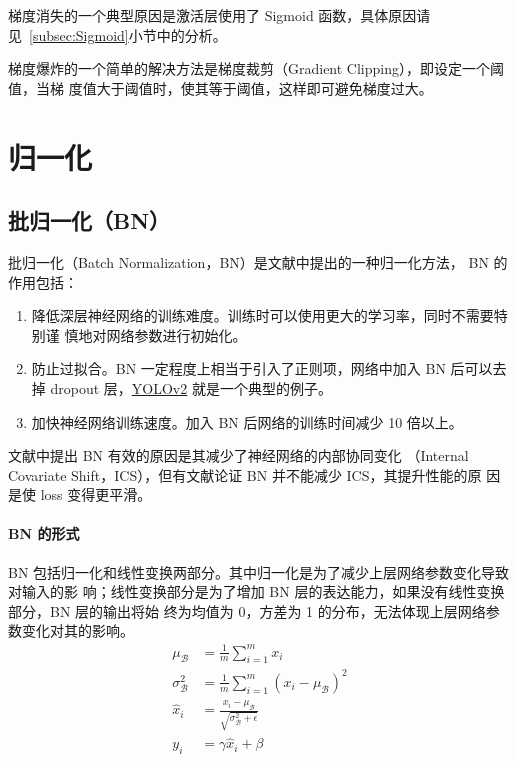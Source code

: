 梯度消失的一个典型原因是激活层使用了 Sigmoid 函数，具体原因请
见~\ref{subsec:Sigmoid}小节中的分析。

梯度爆炸的一个简单的解决方法是梯度裁剪（Gradient Clipping），即设定一个阈值，当梯
度值大于阈值时，使其等于阈值，这样即可避免梯度过大。

\section{归一化}

\subsection{批归一化（BN）}
\label{sub:BN}

批归一化（Batch Normalization，BN）是文献中提出的一种归一化方法，
BN 的作用包括：

\begin{enumerate}
  \item 降低深层神经网络的训练难度。训练时可以使用更大的学习率，同时不需要特别谨
    慎地对网络参数进行初始化。
  \item 防止过拟合。BN 一定程度上相当于引入了正则项，网络中加入 BN 后可以去
    掉 dropout 层，\hyperref[subsec:YOLOv2]{YOLOv2} 就是一个典型的例子。
  \item 加快神经网络训练速度。加入 BN 后网络的训练时间减少 10 倍以上。
\end{enumerate}

文献中提出 BN 有效的原因是其减少了神经网络的内部协同变化
（Internal Covariate Shift，ICS），但有文献论证 BN 并不能减少 ICS，其提升性能的原
因是使 loss 变得更平滑。

\paragraph{BN 的形式}
BN 包括归一化和线性变换两部分。其中归一化是为了减少上层网络参数变化导致对输入的影
响；线性变换部分是为了增加 BN 层的表达能力，如果没有线性变换部分，BN 层的输出将始
终为均值为 0，方差为 1 的分布，无法体现上层网络参数变化对其的影响。
\begin{align}
  \label{equ:BN}
  \mu_{\mathcal{B}} & = \frac{1}{m} \sum_{i=1}^{m} x_i \\
  \sigma_{\mathcal{B}}^2 & = \frac{1}{m} \sum_{i=1}^{m} (x_i-\mu_{\mathcal{B}})^2 \\
  \hat{x}_i & = \frac{x_i - \mu_{\mathcal{B}}}{\sqrt{\sigma_{\mathcal{B}}^2 + \epsilon}} \\
  y_i & = \gamma \hat{x}_i + \beta
\end{align}

